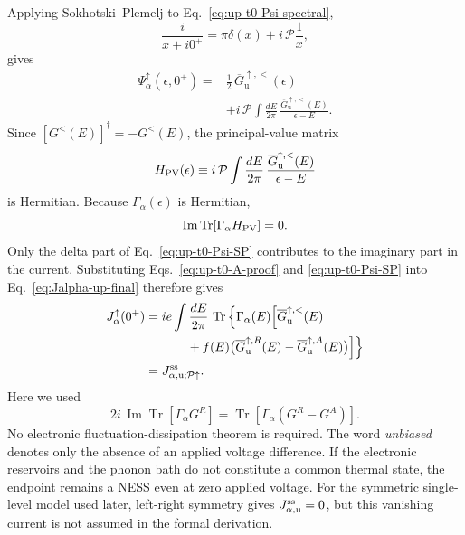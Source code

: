 \documentclass[
 reprint,
 superscriptaddress,
 amsmath,amssymb,
 aps,prb,
 longbibliography,
 floatfix
]{revtex4-2}
\begin{document}
Applying Sokhotski--Plemelj to Eq.~\eqref{eq:up-t0-Psi-spectral},
\begin{equation*}
\frac{i}{x+i0^+}
=
\pi\delta(x)
+i\,\mathcal P\frac{1}{x},
\end{equation*}
gives
\begin{equation}
\begin{aligned}
\Psi_\alpha^\uparrow(\epsilon,0^+)
={}&
\frac12\,
\overline G_{\mathrm u}^{\uparrow,<}(\epsilon)
\\
&+
 i\,\mathcal P
\int\frac{dE}{2\pi}\,
\frac{\overline G_{\mathrm u}^{\uparrow,<}(E)}
{\epsilon-E}.
\end{aligned}
\label{eq:up-t0-Psi-SP}
\end{equation}
Since $[G^<(E)]^\dagger=-G^<(E)$, the principal-value matrix
\begin{equation*}
H_{\rm PV}(\epsilon)
\equiv
 i\,\mathcal P
\int\frac{dE}{2\pi}\,
\frac{\overline G_{\mathrm u}^{\uparrow,<}(E)}
{\epsilon-E}
\end{equation*}
is Hermitian. Because $\Gamma_\alpha(\epsilon)$ is Hermitian,
\begin{equation*}
\operatorname{Im}\operatorname{Tr}
[\Gamma_\alpha H_{\rm PV}]=0.
\end{equation*}
Only the delta part of Eq.~\eqref{eq:up-t0-Psi-SP} contributes to the imaginary part in the current. Substituting Eqs.~\eqref{eq:up-t0-A-proof} and \eqref{eq:up-t0-Psi-SP} into Eq.~\eqref{eq:Jalpha-up-final} therefore gives
\begin{equation}
\begin{aligned}
J_\alpha^\uparrow(0^+)
={}&
 ie\int\frac{dE}{2\pi}\,
 \operatorname{Tr}\Big\{
 \Gamma_\alpha(E)
 \Big[
 \overline G_{\mathrm u}^{\uparrow,<}(E)
 \\
&\qquad+
 f(E)
 \big(
 \overline G_{\mathrm u}^{\uparrow,R}(E)
 -
 \overline G_{\mathrm u}^{\uparrow,A}(E)
 \big)
 \Big]\Big\}
\\
={}&
J_{\alpha,\mathrm u;\mathcal P\uparrow}^{\rm ss}.
\end{aligned}
\label{eq:up-t0-current-proof}
\end{equation}
Here we used
\begin{equation*}
2i\,\operatorname{Im}
\operatorname{Tr}[\Gamma_\alpha G^R]
=
\operatorname{Tr}
[\Gamma_\alpha(G^R-G^A)].
\end{equation*}
No electronic fluctuation-dissipation theorem is required. The word \emph{unbiased} denotes only the absence of an applied voltage difference. If the electronic reservoirs and the phonon bath do not constitute a common thermal state, the endpoint remains a NESS even at zero applied voltage. For the symmetric single-level model used later, left-right symmetry gives $J_{\alpha,\mathrm u}^{\rm ss}=0$, but this vanishing current is not assumed in the formal derivation.
\end{document}
